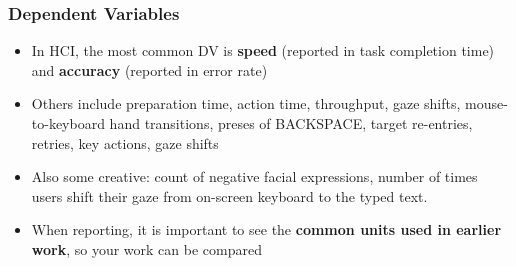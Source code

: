 \documentclass{beamer}
\begin{document}
\begin{frame}
	\frametitle{Dependent Variables}
	\begin{itemize}
		\item In HCI, the most common DV is \textbf{speed} (reported in task completion time) and \textbf{accuracy} (reported in error rate)
		\item Others include preparation time, action time, throughput, gaze shifts, mouse-to-keyboard hand transitions, preses of BACKSPACE, target re-entries, retries, key actions, gaze shifts
		\item Also some creative: count of negative facial expressions, number of times users shift their gaze from on-screen keyboard to the typed text.
		\item When reporting, it is important to see the \textbf{common units used in earlier work}, so your work can be compared 
	\end{itemize}
\end{frame}


%
%
\end{document}
